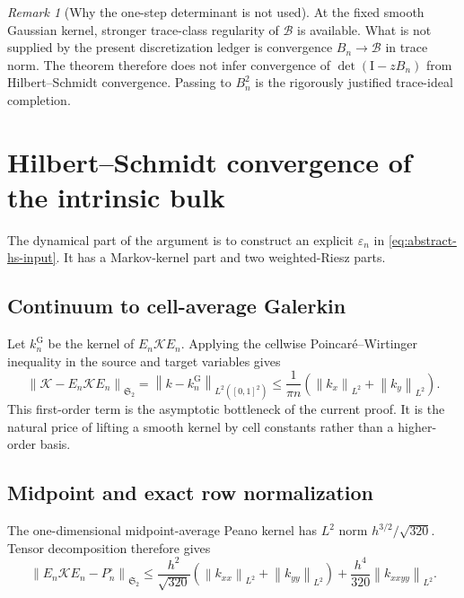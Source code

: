 \documentclass[11pt]{article}
\theoremstyle{definition}
\theoremstyle{remark}
\newtheorem{remark}[theorem]{Remark}
\newcommand{\Id}{\mathrm I}
\newcommand{\cK}{\mathcal K}
\newcommand{\cB}{\mathcal B}
\newcommand{\norm}[1]{\left\lVert #1\right\rVert}
\newcommand{\detF}{\operatorname{det}}
\begin{document}
\begin{remark}[Why the one-step determinant is not used]
\label{rem:one-step-boundary}
At the fixed smooth Gaussian kernel, stronger trace-class regularity of
$\cB$ is available.  What is not supplied by the present discretization
ledger is convergence $B_n\to\cB$ in trace norm.  The theorem therefore
does not infer convergence of $\detF(\Id-zB_n)$ from
Hilbert--Schmidt convergence.  Passing to $B_n^2$ is the rigorously
justified trace-ideal completion.
\end{remark}

\section{Hilbert--Schmidt convergence of the intrinsic bulk}
\label{sec:hs-convergence}

The dynamical part of the argument is to construct an explicit
$\varepsilon_n$ in \eqref{eq:abstract-hs-input}.  It has a Markov-kernel
part and two weighted-Riesz parts.

\subsection{Continuum to cell-average Galerkin}

Let $k_n^{\mathrm G}$ be the kernel of $E_n\cK E_n$.  Applying the
cellwise Poincar\'e--Wirtinger inequality in the source and target variables
gives
\begin{equation}
 \norm{\cK-E_n\cK E_n}_{\mathfrak S_2}
 =\norm{k-k_n^{\mathrm G}}_{L^2([0,1]^2)}
 \le\frac{1}{\pi n}
 \left(\norm{k_x}_{L^2}+\norm{k_y}_{L^2}\right).
 \label{eq:hs-galerkin}
\end{equation}
This first-order term is the asymptotic bottleneck of the current proof.
It is the natural price of lifting a smooth kernel by cell constants rather
than a higher-order basis.

\subsection{Midpoint and exact row normalization}

The one-dimensional midpoint-average Peano kernel has $L^2$ norm
$h^{3/2}/\sqrt{320}$.  Tensor decomposition therefore gives
\begin{equation}
 \norm{E_n\cK E_n-P_n^\circ}_{\mathfrak S_2}
 \le \frac{h^2}{\sqrt{320}}
 \left(\norm{k_{xx}}_{L^2}+\norm{k_{yy}}_{L^2}\right)
 +\frac{h^4}{320}\norm{k_{xxyy}}_{L^2}.
 \label{eq:midpoint-hs}
\end{equation}
\end{document}
